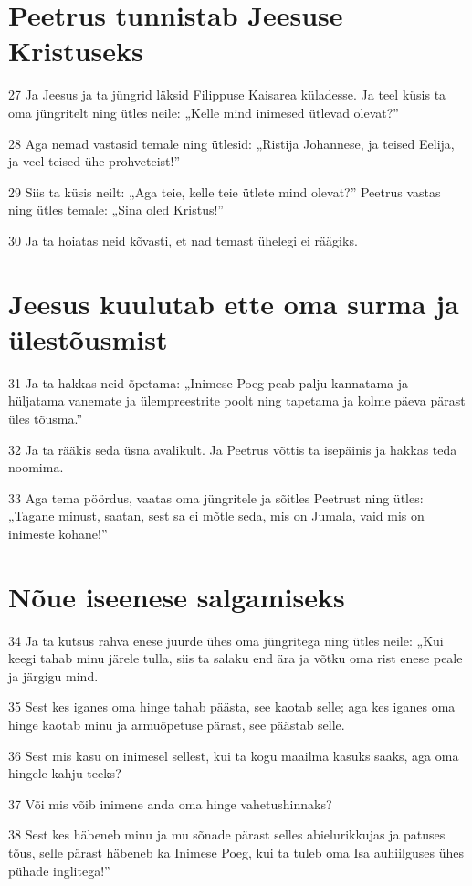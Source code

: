 \section*{Peetrus tunnistab Jeesuse Kristuseks}

\par 27 Ja Jeesus ja ta jüngrid läksid Filippuse Kaisarea küladesse. Ja teel küsis ta oma jüngritelt ning ütles neile: „Kelle mind inimesed ütlevad olevat?”
\par 28 Aga nemad vastasid temale ning ütlesid: „Ristija Johannese, ja teised Eelija, ja veel teised ühe prohveteist!”
\par 29 Siis ta küsis neilt: „Aga teie, kelle teie ütlete mind olevat?” Peetrus vastas ning ütles temale: „Sina oled Kristus!”
\par 30 Ja ta hoiatas neid kõvasti, et nad temast ühelegi ei räägiks.

\section*{Jeesus kuulutab ette oma surma ja ülestõusmist}

\par 31 Ja ta hakkas neid õpetama: „Inimese Poeg peab palju kannatama ja hüljatama vanemate ja ülempreestrite poolt ning tapetama ja kolme päeva pärast üles tõusma.”
\par 32 Ja ta rääkis seda üsna avalikult. Ja Peetrus võttis ta isepäinis ja hakkas teda noomima.
\par 33 Aga tema pöördus, vaatas oma jüngritele ja sõitles Peetrust ning ütles: „Tagane minust, saatan, sest sa ei mõtle seda, mis on Jumala, vaid mis on inimeste kohane!”

\section*{Nõue iseenese salgamiseks}

\par 34 Ja ta kutsus rahva enese juurde ühes oma jüngritega ning ütles neile: „Kui keegi tahab minu järele tulla, siis ta salaku end ära ja võtku oma rist enese peale ja järgigu mind.
\par 35 Sest kes iganes oma hinge tahab päästa, see kaotab selle; aga kes iganes oma hinge kaotab minu ja armuõpetuse pärast, see päästab selle.
\par 36 Sest mis kasu on inimesel sellest, kui ta kogu maailma kasuks saaks, aga oma hingele kahju teeks?
\par 37 Või mis võib inimene anda oma hinge vahetushinnaks?
\par 38 Sest kes häbeneb minu ja mu sõnade pärast selles abielurikkujas ja patuses tõus, selle pärast häbeneb ka Inimese Poeg, kui ta tuleb oma Isa auhiilguses ühes pühade inglitega!”


